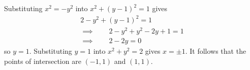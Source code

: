 \documentclass[answers,12pt,addpoints]{exam}
\begin{document}
\begin{questions}
\begin{parts}
\begin{solution}[1in]
Substituting $x^2=-y^2$ into $x^2+\left(y-1\right)^2=1$
gives
\begin{align*}
2-y^2+\left(y-1\right)^2=1\\
\implies\qquad 2-y^2+y^2-2y+1=1\\
\implies\qquad 2-2y=0
\end{align*}
so $y=1$. Substituting $y=1$ into $x^2+y^2=2$ gives $x=\pm 1$.
It follows that the points of intersection are $\left(-1,1\right)$
and $\left(1,1\right)$.
\end{solution}

\end{parts}
\end{questions}
\end{document}
